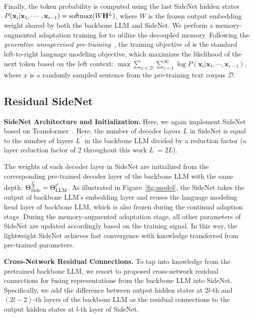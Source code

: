 Finally, the token probability is computed using the last SideNet hidden states 
$P(\mathbf{x}_i|\mathbf{x}_1,\cdots,\mathbf{x}_{i-1})=\textnormal{softmax}(W\mathbf{H}^L)$, where $W$ is the frozen output embedding weight shared by both the backbone LLM and SideNet. We perform a memory-augmented adaptation training for \our{} to utilize the decoupled memory. Following the \textit{generative unsupervised pre-training}~\cite{gpt1}, the training objective of \our{} is the standard left-to-right language modeling objective, which maximizes the likelihood of the next token based on the left context: $\max \sum_{x \in \mathcal{D}} \sum_{i=1}^{|\mathbf{x}|} \log P(\mathbf{x}_i|\mathbf{x}_1,\cdots,\mathbf{x}_{i-1}),$
where $x$ is a randomly sampled sentence from the pre-training text corpus $\mathcal{D}$.

\subsection{Residual SideNet}
\label{ssec:res_sidenet}
\textbf{SideNet Architecture and Initialization.} Here, we again implement SideNet based on Transformer~\cite{Vaswani2017AttentionIA}. Here, the number of decoder layers $L$ in SideNet is equal to the number of layers $L^{\prime}$ in the backbone LLM divided by a reduction factor (a layer reduction factor of $2$ throughout this work $L^\prime=2L$).

The weights of each decoder layer in SideNet are initialized from the corresponding pre-trained decoder layer of the backbone LLM with the same depth: $\Theta_{\textnormal{Side}}^{{l^\prime}\over 2}=\Theta_{\textnormal{LLM}}^{{l^\prime}}$.
As illustrated in Figure~\ref{fig:model}, the SideNet takes the output of backbone LLM's embedding layer and reuses the language modeling head layer of backbone LLM, which is also frozen during the continual adaption stage. During the memory-augmented adaptation stage, all other parameters of SideNet are updated accordingly based on the training signal. In this way, the lightweight SideNet achieves fast convergence with knowledge transferred from pre-trained parameters.

\textbf{Cross-Network Residual Connections.} To tap into knowledge from the pretrained backbone LLM, we resort to proposed cross-network residual connections for fusing representations from the backbone LLM into SideNet. Specifically, we add the difference between output hidden states at $2l$-th and $(2l-2)$-th layers of the backbone LLM as the residual connections to the output hidden states at $l$-th layer of SideNet.

